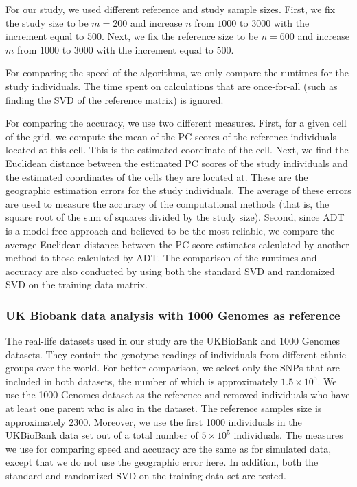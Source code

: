 \documentclass{article}
\begin{document}
For our study, we used different reference and study sample sizes.
First, we fix
the study size to be $m=200$ and increase $n$ from $1000$ to $3000$ with the
increment equal to $500$.
Next, we fix
the reference size to be $n=600$ and increase $m$ from $1000$ to $3000$ with the increment equal to $500$.

For comparing the speed of the algorithms,
we only compare the runtimes for the study individuals.
The time spent on calculations that are once-for-all (such as finding the SVD of
the reference matrix) is ignored.

For comparing the accuracy, we use two different measures.
First, for a given cell of the grid, we compute the mean of the PC scores of the 
reference individuals located at this cell.  
This is the estimated coordinate of the cell.
Next, we find the Euclidean distance between the estimated PC scores of the
study individuals and the estimated coordinates of the cells they are located
at.
These are the geographic estimation errors for the study individuals.
The average of these errors are used to measure the accuracy of the
computational methods (that is, the square root of the sum of squares divided by the
study size). 
Second, since ADT is a model free approach and believed to be the most reliable, we compare the average
Euclidean distance between the PC score estimates calculated by another method
to those calculated by ADT. 
The comparison of the runtimes and accuracy are also conducted by using both the
standard SVD and randomized SVD on the training data matrix.

\subsubsection{UK Biobank data analysis with 1000 Genomes as reference}

The real-life datasets used in our study are the UKBioBank and 1000 Genomes datasets.
They contain the genotype readings of individuals from different ethnic groups over the world.
For better comparison, we select only the SNPs that are included in both datasets,
the number of which is approximately $1.5 \times 10^5$.
We use the 1000 Genomes dataset as the reference and removed individuals who have at least one parent who is also in the dataset.
The reference samples size is approximately $2300$.
Moreover, we use the first 1000 individuals in the UKBioBank data set out of a
total number of $5 \times 10^5$ individuals. 
The measures we use for comparing speed and accuracy are the same as for
simulated data,
except that we do not use the geographic error here.
In addition, both the standard and randomized SVD on the training data set are tested.
\end{document}
